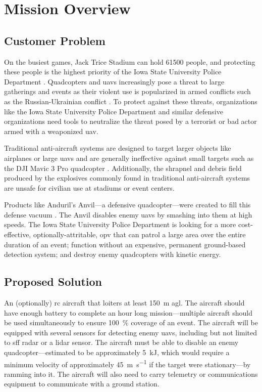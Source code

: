 \chapter{Mission Overview}\label{cp:mission_overview}

\section{Customer Problem}

On the busiest games, Jack Trice Stadium can hold \num{61500} people, and protecting these people is the highest priority of the Iowa State University Police Department \citep{stadium}. Quadcopters and \acrfull{uavs} increasingly pose a threat to large gatherings and events as their violent use is popularized in armed conflicts such as the Russian-Ukrainian conflict \citep{thompson2024}. To protect against these threats, organizations like the Iowa State University Police Department and similar defensive organizations need tools to neutralize the threat posed by a terrorist or bad actor armed with a weaponized \acrshort{uav}.

Traditional anti-aircraft systems are designed to target larger objects like airplanes or large \acrshort{uavs} and are generally ineffective against small targets such as the DJI Mavic 3 Pro quadcopter \citep{mavic3}. Additionally, the shrapnel and debris field produced by the explosives commonly found in traditional anti-aircraft systems are unsafe for civilian use at stadiums or event centers.

Products like Anduril's Anvil—a defensive quadcopter—were created to fill this defense vacuum \citep{anvil}. The Anvil disables enemy \acrshort{uavs} by smashing into them at high speeds. The Iowa State University Police Department is looking for a more cost-effective, optionally-attritable, \acrfull{opv} that can patrol a large area over the entire duration of an event; function without an expensive, permanent ground-based detection system; and destroy enemy quadcopters with kinetic energy.

\section{Proposed Solution}

An (optionally) \acrfull{rc} aircraft that loiters at least \qty{150}{\meter} \acrfull{agl}. The aircraft should have enough battery to complete an hour long mission—multiple aircraft should be used simultaneously to ensure \qty{100}{\percent} coverage of an event. The aircraft will be equipped with several sensors for detecting enemy \acrshort{uavs}, including but not limited to \acrfull{sff} radar or a \acrfull{lidar} sensor. The aircraft must be able to disable an enemy quadcopter—estimated to be approximately \qty{5}{\kilo\joule}, which would require a minimum velocity of approximately \qty{45}{\meter\per\second} if the target were stationary—by ramming into it. The aircraft will also need to carry telemetry or communications equipment to communicate with a ground station.
